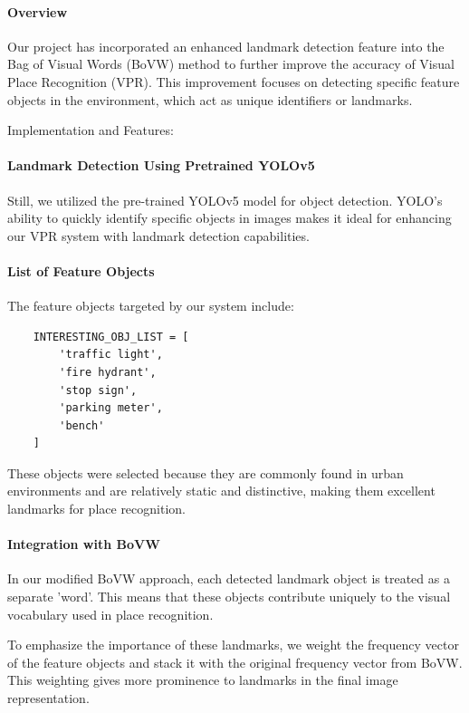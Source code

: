 \documentclass[conference]{IEEEtran}
\begin{document}
\paragraph{Overview}
Our project has incorporated an enhanced landmark detection feature into the Bag of Visual Words (BoVW) method to further improve the accuracy of Visual Place Recognition (VPR). This improvement focuses on detecting specific feature objects in the environment, which act as unique identifiers or landmarks.

Implementation and Features:

\paragraph{Landmark Detection Using Pretrained YOLOv5}

Still, we utilized the pre-trained YOLOv5 model for object detection. YOLO's ability to quickly identify specific objects in images makes it ideal for enhancing our VPR system with landmark detection capabilities.

\paragraph{List of Feature Objects}

The feature objects targeted by our system include:

\begin{verbatim}
    INTERESTING_OBJ_LIST = [
        'traffic light',
        'fire hydrant',
        'stop sign',
        'parking meter',
        'bench'
    ]
\end{verbatim}

These objects were selected because they are commonly found in urban environments and are relatively static and distinctive, making them excellent landmarks for place recognition.

\paragraph{Integration with BoVW}

In our modified BoVW approach, each detected landmark object is treated as a separate 'word'. This means that these objects contribute uniquely to the visual vocabulary used in place recognition.

To emphasize the importance of these landmarks, we weight the frequency vector of the feature objects and stack it with the original frequency vector from BoVW. This weighting gives more prominence to landmarks in the final image representation.
\end{document}
